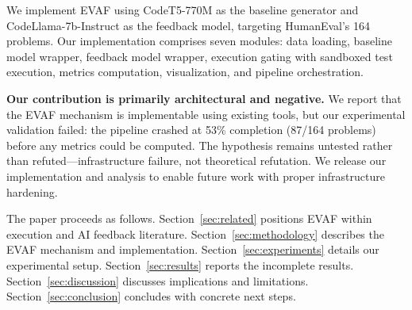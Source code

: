 We implement EVAF using CodeT5-770M as the baseline generator and CodeLlama-7b-Instruct as the feedback model, targeting HumanEval's 164 problems. Our implementation comprises seven modules: data loading, baseline model wrapper, feedback model wrapper, execution gating with sandboxed test execution, metrics computation, visualization, and pipeline orchestration.

\textbf{Our contribution is primarily architectural and negative.} We report that the EVAF mechanism is implementable using existing tools, but our experimental validation failed: the pipeline crashed at 53\% completion (87/164 problems) before any metrics could be computed. The hypothesis remains untested rather than refuted---infrastructure failure, not theoretical refutation. We release our implementation and analysis to enable future work with proper infrastructure hardening.

The paper proceeds as follows. Section~\ref{sec:related} positions EVAF within execution and AI feedback literature. Section~\ref{sec:methodology} describes the EVAF mechanism and implementation. Section~\ref{sec:experiments} details our experimental setup. Section~\ref{sec:results} reports the incomplete results. Section~\ref{sec:discussion} discusses implications and limitations. Section~\ref{sec:conclusion} concludes with concrete next steps.
